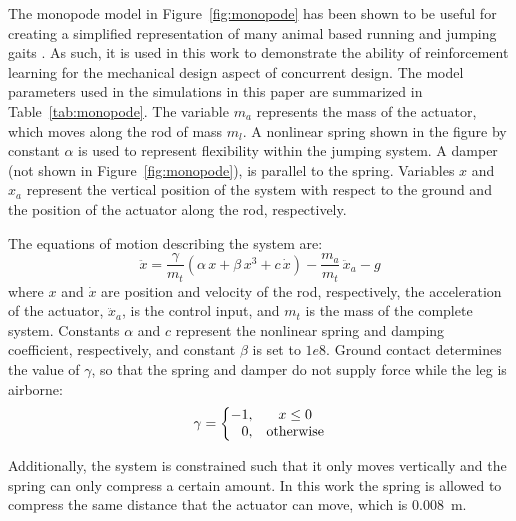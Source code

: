 \documentclass[10pt,twocolumn,letterpaper]{article}
\begin{document}
The monopode model in Figure~\ref{fig:monopode} has been shown to be useful for creating a simplified representation of many animal based running and jumping gaits \cite{Blickhan1993a}. As such, it is used in this work to demonstrate the ability of reinforcement learning for the mechanical design aspect of concurrent design. The model parameters used in the simulations in this paper are summarized in Table~\ref{tab:monopode}.
%
The variable $m_a$ represents the mass of the actuator, which moves along the rod of mass $m_l$. A nonlinear spring shown in the figure by constant $\alpha$ is used to represent flexibility within the jumping system. A damper (not shown in Figure~\ref{fig:monopode}), is parallel to the spring. Variables $x$ and $x_a$ represent the vertical position of the system with respect to the ground and the position of the actuator along the rod, respectively.
	
The equations of motion describing the system are:
%	
\begin{equation}
		\ddot{x} = \frac{\gamma}{m_t} \left(\alpha\,x + \beta\,x^3 + c\,\dot{x}\right)-\frac{m_a}{m_t}\,\ddot{x}_a-g
\end{equation}
%
where $x$ and $\dot{x}$ are position and velocity of the rod, respectively, the acceleration of the actuator, $\ddot{x}_a$, is the control input, and $m_t$ is the mass of the complete system. Constants $\alpha$ and $c$ represent the nonlinear spring and damping coefficient, respectively, and constant $\beta$ is set to $1e8$. Ground contact determines the value of $\gamma$, so that the spring and damper do not supply force while the leg is airborne:
%
	\begin{equation}
		\gamma =
		\left\{\begin{matrix}
		   -1, & x \leq 0\\ 
		   \hphantom{-} 0, & \mbox{otherwise}
		   \end{matrix}\right.
	 \end{equation}
%

Additionally, the system is constrained such that it only moves vertically and the spring can only compress a certain amount. In this work the spring is allowed to compress the same distance that the actuator can move, which is 0.008~m.
\end{document}
